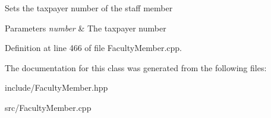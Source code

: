 Sets the taxpayer number of the staff member 
\begin{DoxyParams}{Parameters}
{\em number} & The taxpayer number \\
\hline
\end{DoxyParams}


Definition at line 466 of file Faculty\+Member.\+cpp.



The documentation for this class was generated from the following files\+:\begin{DoxyCompactItemize}
\item 
include/Faculty\+Member.\+hpp\item 
src/Faculty\+Member.\+cpp\end{DoxyCompactItemize}
